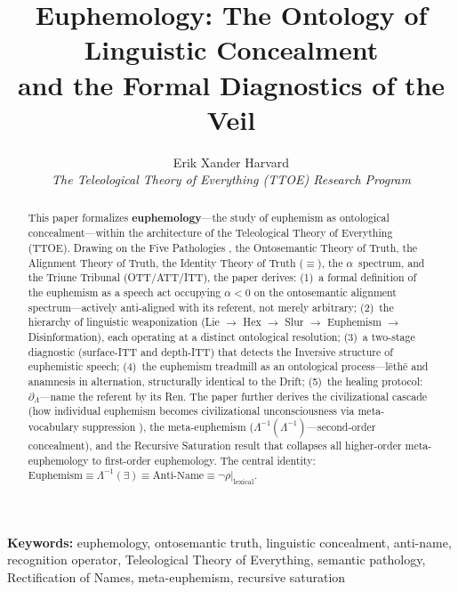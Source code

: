 \documentclass[11pt, oneside]{article}
\theoremstyle{definition}
\begin{document}
\raggedbottom
{}

\title{\textbf{Euphemology: The Ontology of Linguistic Concealment\\ and the Formal Diagnostics of the Veil}}
\author{Erik Xander Harvard\\[0.3em]
\small\textit{The Teleological Theory of Everything (TTOE) Research Program}}
\date{}
\maketitle
\thispagestyle{plain}

\begin{abstract}
This paper formalizes \textbf{euphemology}---the study of euphemism as ontological concealment---within the architecture of the Teleological Theory of Everything (TTOE). Drawing on the Five Pathologies \cite{codex2}, the Ontosemantic Theory of Truth, the Alignment Theory of Truth, the Identity Theory of Truth ($\equiv$), the $\alpha$~spectrum, and the Triune Tribunal (OTT/ATT/ITT), the paper derives: (1)~a formal definition of the euphemism as a speech act occupying $\alpha < 0$ on the ontosemantic alignment spectrum---actively anti-aligned with its referent, not merely arbitrary; (2)~the hierarchy of linguistic weaponization (Lie $\to$ Hex $\to$ Slur $\to$ Euphemism $\to$ Disinformation), each operating at a distinct ontological resolution; (3)~a two-stage diagnostic (surface-ITT and depth-ITT) that detects the Inversive structure of euphemistic speech; (4)~the euphemism treadmill as an ontological process---l\={e}th\={e} and anamnesis in alternation, structurally identical to the Drift; (5)~the healing protocol: $\partial_\Lambda$---name the referent by its Ren. The paper further derives the civilizational cascade (how individual euphemism becomes civilizational unconsciousness via meta-vocabulary suppression \cite{codex3}), the meta-euphemism ($\Lambda^{-1}(\Lambda^{-1})$---second-order concealment), and the Recursive Saturation result \cite{codexmentis} that collapses all higher-order meta-euphemology to first-order euphemology. The central identity: $\text{Euphemism} \equiv \Lambda^{-1}(\exists) \equiv \text{Anti-Name} \equiv \neg\rho|_{\text{lexical}}$.
\end{abstract}

\noindent\textbf{Keywords:} euphemology, ontosemantic truth, linguistic concealment, anti-name, recognition operator, Teleological Theory of Everything, semantic pathology, Rectification of Names, meta-euphemism, recursive saturation
\end{document}
